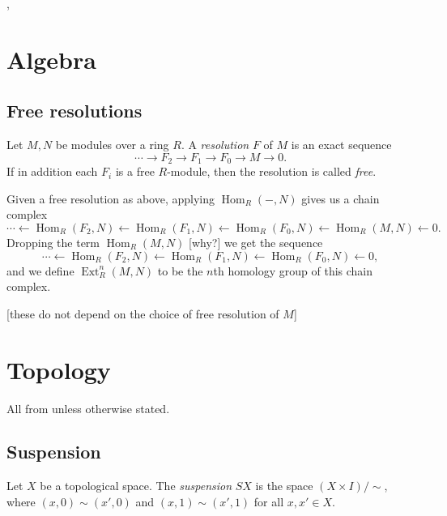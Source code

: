 \documentclass{MetricNotes2023}
\DeclareMathOperator{\Ext}{Ext}
\DeclareMathOperator{\Hom}{Hom}
\DeclareMathOperator{\im}{im}
\begin{document}
\autocite{stable_homotopy}, \autocite{cobordism}

\appendix 

\section{Algebra}

\subsection{Free resolutions}

\begin{definition}
Let \(M, N\) be modules over a ring \(R\). A \textit{resolution} \(F\) of \(M\) is an exact sequence 
\[\cdots \to F_2 \to F_1 \to F_0 \to M \to 0.\]
If in addition each \(F_i\) is a free \(R\)-module, then the resolution is called \textit{free}. 
\end{definition}

Given a free resolution as above, applying \(\Hom_R(-, N)\) gives us a chain complex
\[\cdots \leftarrow \Hom_R(F_2, N) \leftarrow \Hom_R(F_1, N) \leftarrow \Hom_R(F_0, N) \leftarrow \Hom_R(M, N) \leftarrow 0.\]
Dropping the term \(\Hom_R(M, N)\) [why?] we get the sequence
\[\cdots \leftarrow \Hom_R(F_2, N) \leftarrow \Hom_R(F_1, N) \leftarrow \Hom_R(F_0, N) \leftarrow 0,\]
and we define \(\Ext^n_R(M, N)\) to be the \(n\)th homology group of this chain complex. 


[these do not depend on the choice of free resolution of \(M\)]

\section{Topology}

All from \autocite{hatcher} unless otherwise stated.

\subsection{Suspension}

\begin{definition}
Let \(X\) be a topological space. The \textit{suspension} \(SX\) is the space \newline\((X\times I)/\sim\), where \((x, 0)\sim (x', 0)\) and \((x,1)\sim (x',1)\) for all \(x,x'\in X\). 
\end{definition}
\end{document}
